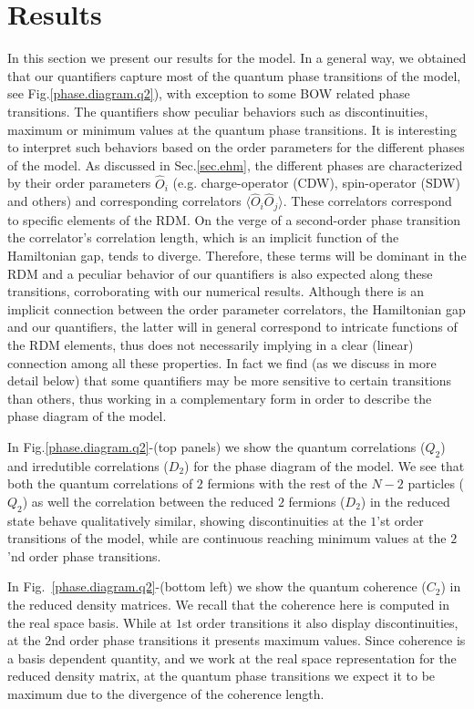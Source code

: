 \documentclass[prb,reprint,showpacs,twocolumn,superscriptaddress]{revtex4-2}
\begin{document}
\section{Results}
\label{sec.results}

In this section we present our results for the model. In a general way, we obtained that our quantifiers  capture 
most of the quantum phase transitions of the model, see Fig.\eqref{phase.diagram.q2}), with exception to some BOW related phase transitions.
The quantifiers show peculiar behaviors such as discontinuities, maximum or minimum values at the quantum phase transitions. 
It is interesting to interpret such behaviors based on the order parameters for the different phases of the model. As discussed in Sec.\eqref{sec.ehm}, the different phases are characterized by their order parameters $\hat O_i$ (e.g. charge-operator (CDW), spin-operator (SDW) and others) and corresponding correlators $\langle \hat O_i \hat O_j \rangle$. These correlators correspond to specific elements of the RDM.
On the verge of a second-order phase transition the correlator's correlation length, which is an implicit function of the Hamiltonian gap, tends to diverge. Therefore, these terms will be dominant in the RDM and a peculiar behavior of our quantifiers is also expected along these transitions, corroborating with our numerical results. 
Although there is an implicit connection between the order parameter correlators, the Hamiltonian gap and our quantifiers, the latter will in general correspond to intricate functions of the RDM elements, thus does not necessarily implying in a clear (linear) connection among all these properties. 
In fact we find (as we discuss in more detail below) that some quantifiers may be more sensitive to certain transitions than others, thus working in a complementary form in order to  describe the phase diagram of the model.

In Fig.\eqref{phase.diagram.q2}-(top panels) we show the quantum correlations ($Q_2$) and 
irredutible correlations ($D_2$) for the phase diagram of the model. 
We see that both the quantum correlations of $2$ fermions with the rest of the $N-2$ particles ($Q_2$) as well the correlation between the reduced $2$ fermions ($D_2$) in the reduced state behave qualitatively similar, showing discontinuities at the $1$'st order transitions of the model, while are continuous reaching minimum values at the $2$'nd order phase transitions. 

In Fig.~\eqref{phase.diagram.q2}-(bottom left) we show the 
quantum coherence ($C_2$) in the reduced density matrices. We recall that the coherence here is computed in the real space basis.
While at $1$st order transitions it also display discontinuities, 
at the $2$nd order phase transitions it presents maximum values. 
Since coherence is a basis dependent quantity, 
and we work at the real space representation for the reduced density matrix, 
at the quantum phase transitions we expect it to be maximum due to the divergence of the coherence length.  
\end{document}
